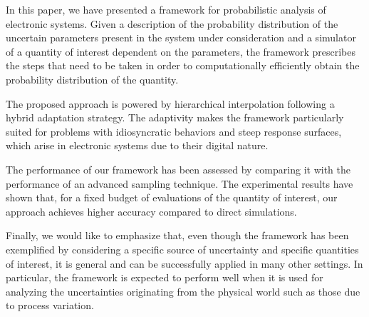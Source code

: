 In this paper, we have presented a framework for probabilistic analysis of
electronic systems. Given a description of the probability distribution of the
uncertain parameters present in the system under consideration and a simulator
of a quantity of interest dependent on the parameters, the framework prescribes
the steps that need to be taken in order to computationally efficiently obtain
the probability distribution of the quantity.

The proposed approach is powered by hierarchical interpolation following a
hybrid adaptation strategy. The adaptivity makes the framework particularly
suited for problems with idiosyncratic behaviors and steep response surfaces,
which arise in electronic systems due to their digital nature.

The performance of our framework has been assessed by comparing it with the
performance of an advanced sampling technique. The experimental results have
shown that, for a fixed budget of evaluations of the quantity of interest, our
approach achieves higher accuracy compared to direct simulations.

Finally, we would like to emphasize that, even though the framework has been
exemplified by considering a specific source of uncertainty and specific
quantities of interest, it is general and can be successfully applied in many
other settings. In particular, the framework is expected to perform well when it
is used for analyzing the uncertainties originating from the physical world such
as those due to process variation.
